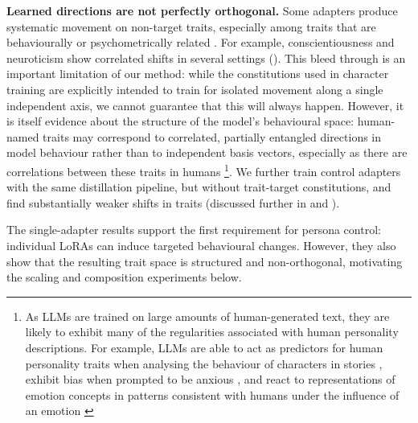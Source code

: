 \textbf{Learned directions are not perfectly orthogonal.} Some adapters produce systematic movement on non-target traits, especially among traits that are behaviourally or psychometrically related \citep{digman1997higher}. For example, conscientiousness and neuroticism show correlated shifts in several settings (). This bleed through is an important limitation of our method: while the constitutions used in character training are explicitly intended to train for isolated movement along a single independent axis, we cannot guarantee that this will always happen. However, it is itself evidence about the structure of the model’s behavioural space: human-named traits may correspond to correlated, partially entangled directions in model behaviour rather than to independent basis vectors, especially as there are correlations between these traits in humans \citep{digman1990personality,digman1997higher}\footnote{As LLMs are trained on large amounts of human-generated text, they are likely to exhibit many of the regularities associated with human personality descriptions. For example, LLMs are able to act as predictors for human personality traits when analysing the behaviour of characters in stories \citep{suh2024rediscovering}, exhibit bias when prompted to be anxious \citep{codaforno2024inducinganxietylargelanguage}, and react to representations of emotion concepts in patterns consistent with humans under the influence of an emotion \citep{sofroniew2026twheemotion}}. We further train control adapters with the same distillation pipeline, but without trait-target constitutions, and find substantially weaker shifts in traits (discussed further in  and ).

The single-adapter results support the first requirement for persona control: individual LoRAs can induce targeted behavioural changes. However, they also show that the resulting trait space is structured and non-orthogonal, motivating the scaling and composition experiments below.


